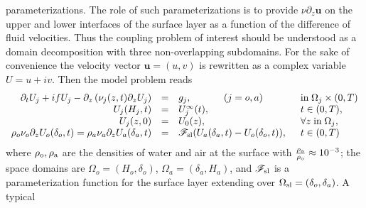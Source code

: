 parameterizations. The role of such parameterizations is to provide 
$\nu \partial_z \mathbf{u}$ on the upper and lower interfaces of the 
surface layer as a function of the difference of fluid velocities.
Thus the coupling problem of interest should be understood as a domain
decomposition with three non-overlapping subdomains. For the sake 
of convenience the velocity vector $\mathbf{u} = (u,v)$ 
is rewritten as a complex variable $U = u + i v$. Then the model problem reads   
\begin{equation}
\label{eq:cplProblem}
\begin{array}{rcll}
\partial_t U_j + i f U_j - \partial_z \left( \nu_j(z,t) \partial_z U_j \right) &=& g_j,
~~~~~~~~~~ (j=o,a)
& \mbox{in}\;\Omega_j \times (0,T)\\
U_j(H_j,t) &=& U_j^\infty(t),  & t \in (0,T), \\ 
U_j(z,0) &=& U_0(z), & \forall z \; \mbox{in}\; \Omega_j, \\
\rho_o \nu_o \partial_z U_o(\delta_o,t) = \rho_a \nu_a \partial_z U_a(\delta_a,t)
&=& {\cal F}_{\rm sl}( U_a(\delta_a,t)-U_o(\delta_o,t) ), \;\; & t \in (0,T)
\end{array}
\end{equation}
where $\rho_{\rm o}, \rho_{\rm a}$ are the densities of water and
air at the surface with
$\frac{\rho_{\rm a}}{\rho_{\rm o}} \approx 10^{-3}$;
the space domains are
$\Omega_o= (H_o,\delta_o)$, $\Omega_a = (\delta_a,H_a)$, and 
${\cal F}_{\rm sl}$ is a parameterization function for the surface layer 
extending over $\Omega_{\rm sl} = (\delta_o,\delta_a)$. A typical 
